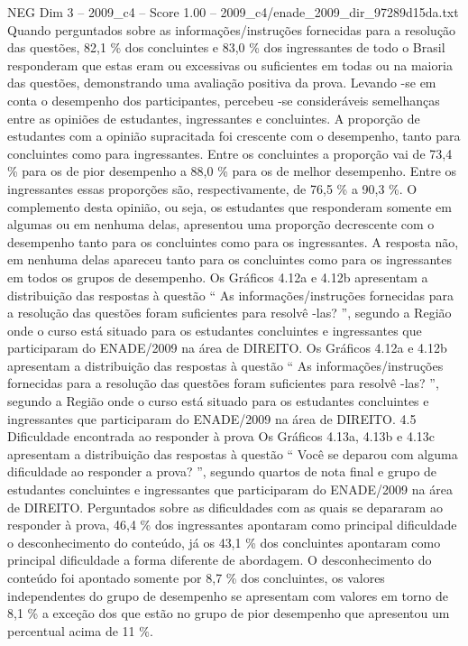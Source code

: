 \begin{textsample}{NEG Dim 3 – 2009\_c4 – Score 1.00 – 2009\_c4/enade\_2009\_dir\_97289d15da.txt}
Quando perguntados sobre as informações/instruções fornecidas para a resolução das questões, 82,1 \% dos concluintes e 83,0 \% dos ingressantes de todo o Brasil responderam que estas eram ou excessivas ou suficientes em todas ou na maioria das questões, demonstrando uma avaliação positiva da prova.
Levando -se em conta o desempenho dos participantes, percebeu -se consideráveis semelhanças entre as opiniões de estudantes, ingressantes e concluintes.
A proporção de estudantes com a opinião supracitada foi crescente com o desempenho, tanto para concluintes como para ingressantes.
Entre os concluintes a proporção vai de 73,4 \% para os de pior desempenho a 88,0 \% para os de melhor desempenho.
Entre os ingressantes essas proporções são, respectivamente, de 76,5 \% a 90,3 \%.
O complemento desta opinião, ou seja, os estudantes que responderam somente em algumas ou em nenhuma delas, apresentou uma proporção decrescente com o desempenho tanto para os concluintes como para os ingressantes.
A resposta não, em nenhuma delas apareceu tanto para os concluintes como para os ingressantes em todos os grupos de desempenho.
Os Gráficos 4.12a e 4.12b apresentam a distribuição das respostas à questão “ As informações/instruções fornecidas para a resolução das questões foram suficientes para resolvê -las? ”, segundo a Região onde o curso está situado para os estudantes concluintes e ingressantes que participaram do ENADE/2009 na área de DIREITO.
Os Gráficos 4.12a e 4.12b apresentam a distribuição das respostas à questão “ As informações/instruções fornecidas para a resolução das questões foram suficientes para resolvê -las? ”, segundo a Região onde o curso está situado para os estudantes concluintes e ingressantes que participaram do ENADE/2009 na área de DIREITO. 4.5 Dificuldade encontrada ao responder à prova Os Gráficos 4.13a, 4.13b e 4.13c apresentam a distribuição das respostas à questão “ Você se deparou com alguma dificuldade ao responder a prova? ”, segundo quartos de nota final e grupo de estudantes concluintes e ingressantes que participaram do ENADE/2009 na área de DIREITO.
Perguntados sobre as dificuldades com as quais se depararam ao responder à prova, 46,4 \% dos ingressantes apontaram como principal dificuldade o desconhecimento do conteúdo, já os 43,1 \% dos concluintes apontaram como principal dificuldade a forma diferente de abordagem.
O desconhecimento do conteúdo foi apontado somente por 8,7 \% dos concluintes, os valores independentes do grupo de desempenho se apresentam com valores em torno de 8,1 \% a exceção dos que estão no grupo de pior desempenho que apresentou um percentual acima de 11 \%.

\end{textsample}
